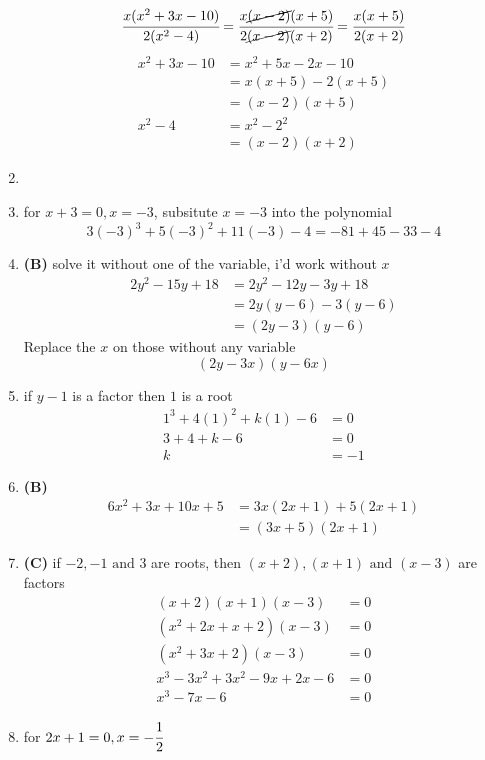 \begin{multicols}{2}
\begin{enumerate}[label={\textbf{\arabic*.}}]
    \[\cfrac{x(x^2 + 3x - 10)}{2(x^2 - 4)} = \cfrac{x\cancel{(x-2)}(x+5)}{2\cancel{(x-2)}(x+2)} = \cfrac{x(x+5)}{2(x+2)}\]
        \begin{align*}
        x^2 + 3x - 10 &= x^2 + 5x - 2x - 10 \\ 
        &= x(x+5) - 2(x+5) \\ 
        &= (x-2)(x+5) \\
        x^2 - 4 &= x^2 - 2^2 \\ 
        &= (x-2)(x+2)
        \end{align*}    
\item 
\item for $x+3 = 0 , x = -3$, subsitute $x=-3$ into the polynomial \\
    $$3(-3)^3 + 5(-3)^2 + 11(-3) - 4 = -81 + 45 -33 - 4$$ 
    \item \textbf{(B)} solve it without one of the variable, i'd work without $x$ 
    \begin{align*}
    2y^2 - 15y + 18 &= 2y^2 -12y - 3y + 18  \\ 
    &= 2y(y-6) -3(y-6)  \\ 
    &= (2y-3)(y-6)
    \end{align*}
    Replace the $x$ on those without any variable 
    $$(2y-3x)(y-6x)$$
    \item if $y-1$ is a factor then $1$ is a root 
    \begin{align*}
    1^3 + 4(1)^2 + k(1) - 6 &= 0 \\
    3+ 4 + k - 6 &= 0 \\
    k & = -1
    \end{align*}
    \item \textbf{(B)} 
    \begin{align*} 6x^2 + 3x + 10x + 5 &= 3x(2x + 1) + 5(2x+1) \\ &= (3x+5)(2x+1) \end{align*}
    \item \textbf{(C)} if $-2, -1 \text{ and } 3$ are roots, then $(x+2), (x+1) \text{ and } (x-3)$ are factors 
        \begin{align*} 
            (x+2)(x+1)(x-3) &= 0 \\
            (x^2 + 2x + x + 2)(x-3) &= 0 \\
            (x^2 + 3x + 2)(x-3) &= 0 \\
            x^3 - 3x^2 +3x^2 - 9x + 2x -6 & = 0 \\
            x^3 -7x -6 & = 0 
        \end{align*}
    \item for $2x+1 = 0, x = -\cfrac{1}{2}$ \\

\end{enumerate}
\end{multicols}
